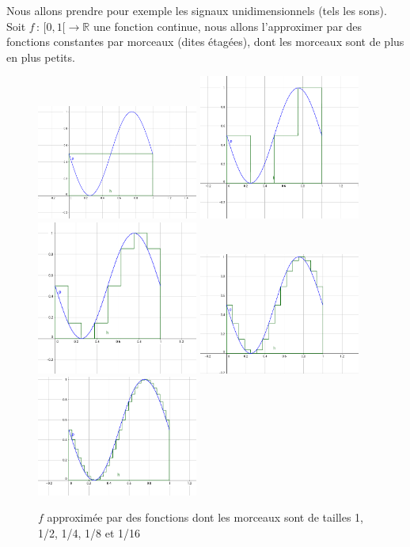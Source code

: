 \documentclass[]{article}
\theoremstyle{remark}
\theoremstyle{definition}
\newcommand{\funcshort}[3]{
	#1 \, : \, #2 \longrightarrow #3
}
\begin{document}
	Nous allons prendre pour exemple les signaux unidimensionnels (tels les sons). Soit $\funcshort{f}{[0, 1[}{\mathbb{R}}$ une fonction continue, nous allons l'approximer par des fonctions constantes par morceaux (dites étagées), dont les morceaux sont de plus en plus petits.
	
	\begin{figure}[h]
		\label{sine-stairs}
		\centering
		\includegraphics[width=150pt]{sin_1.png}
		\includegraphics[width=150pt]{sin_2.png}
		\includegraphics[width=150pt]{sin_4.png}
		\includegraphics[width=150pt]{sin_8.png}
		\includegraphics[width=150pt]{sin_16.png}
		\caption{$f$ approximée par des fonctions dont les morceaux sont de tailles 1, 1/2, 1/4, 1/8 et 1/16}
	\end{figure}
	
\end{document}
